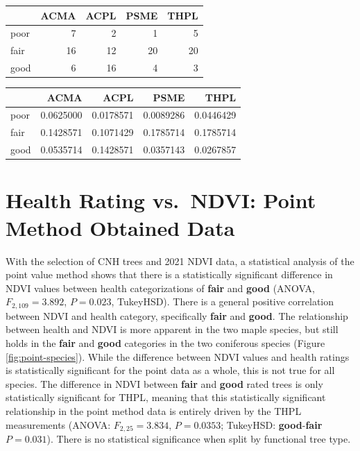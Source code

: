 \documentclass[12pt,twoside]{reedthesis}
\begin{document}
\begin{table}
\caption{\label{tab:table-freq-test-2}Frequency and probability tables of functional tree type and health rating for CNH trees. There is a statistically significant relationship between the two variables ($X^2$(2, N=112) = 10.184, p = 0.00615)}
\begin{longtable}[t]{lrrrr}
\toprule
  & ACMA & ACPL & PSME & THPL\\
\midrule
poor & 7 & 2 & 1 & 5\\
fair & 16 & 12 & 20 & 20\\
good & 6 & 16 & 4 & 3\\
\bottomrule
\end{longtable}
\begin{longtable}[t]{lrrrr}
\toprule
  & ACMA & ACPL & PSME & THPL\\
\midrule
poor & 0.0625000 & 0.0178571 & 0.0089286 & 0.0446429\\
fair & 0.1428571 & 0.1071429 & 0.1785714 & 0.1785714\\
good & 0.0535714 & 0.1428571 & 0.0357143 & 0.0267857\\
\bottomrule
\end{longtable}
\end{table}
\hypertarget{health-rating-vs.-ndvi-point-method-obtained-data}{%
\section{Health Rating vs.~NDVI: Point Method Obtained Data}\label{health-rating-vs.-ndvi-point-method-obtained-data}}

With the selection of CNH trees and 2021 NDVI data, a statistical
analysis of the point value method shows that there is a statistically
significant difference in NDVI values between health categorizations of
\textbf{fair} and \textbf{good} (ANOVA, \(F_{2, 109} = 3.892\), \(P = 0.023\),
TukeyHSD). There is a general positive correlation between NDVI and
health category, specifically \textbf{fair} and \textbf{good}. The relationship
between health and NDVI is more apparent in the two maple species, but
still holds in the \textbf{fair} and \textbf{good} categories in the two
coniferous species (Figure \ref{fig:point-species}). While the
difference between NDVI values and health ratings is statistically
significant for the point data as a whole, this is not true for all
species. The difference in NDVI between \textbf{fair} and \textbf{good} rated
trees is only statistically significant for THPL, meaning that this
statistically significant relationship in the point method data is
entirely driven by the THPL measurements (ANOVA: \(F_{2, 25} = 3.834\),
\(P = 0.0353\); TukeyHSD: \textbf{good}-\textbf{fair} \(P = 0.031\)). There is no
statistical significance when split by functional tree type.
\end{document}
